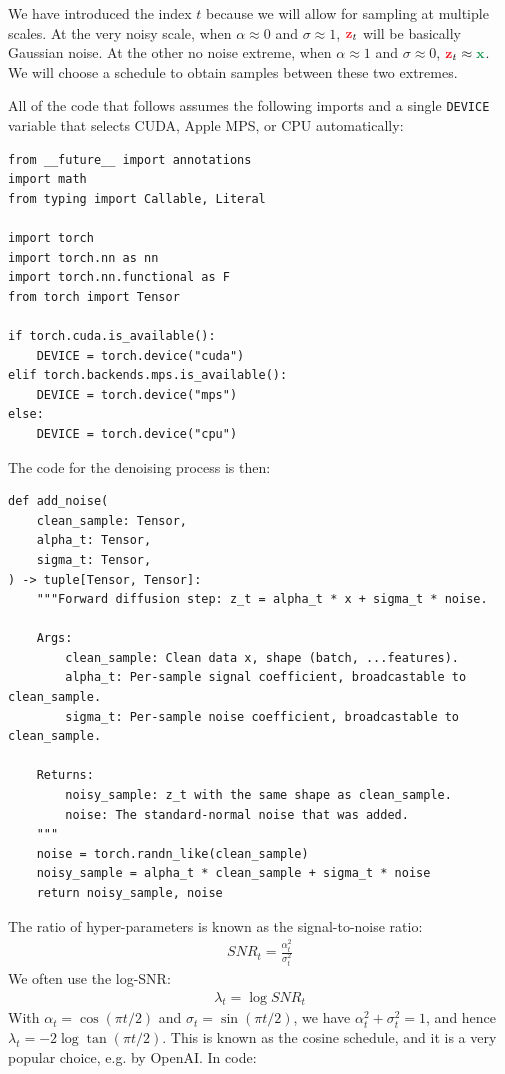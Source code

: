 \documentclass[usenames,dvipsnames]{article}
\newcommand{\myvec}[1]{\mathbf{#1}}
\newcommand{\vx}{\myvec{\textcolor{ForestGreen}{x}}}
\newcommand{\vz}{\myvec{\textcolor{Red}{z}}}
\begin{document}
We have introduced the index $t$ because we will allow for sampling at multiple scales. At the very noisy scale, when $\alpha \approx 0$ and $\sigma \approx 1$, $\vz_t$ will be basically Gaussian noise. At the other no noise extreme, when $\alpha \approx 1$ and $\sigma \approx 0$, $\vz_t \approx \vx$. We will choose a schedule to obtain samples between these two extremes.

All of the code that follows assumes the following imports and a single \texttt{DEVICE} variable that selects CUDA, Apple MPS, or CPU automatically:
\begin{verbatim}
from __future__ import annotations
import math
from typing import Callable, Literal

import torch
import torch.nn as nn
import torch.nn.functional as F
from torch import Tensor

if torch.cuda.is_available():
    DEVICE = torch.device("cuda")
elif torch.backends.mps.is_available():
    DEVICE = torch.device("mps")
else:
    DEVICE = torch.device("cpu")
\end{verbatim}

The code for the denoising process is then:

\begin{verbatim}
def add_noise(
    clean_sample: Tensor,
    alpha_t: Tensor,
    sigma_t: Tensor,
) -> tuple[Tensor, Tensor]:
    """Forward diffusion step: z_t = alpha_t * x + sigma_t * noise.

    Args:
        clean_sample: Clean data x, shape (batch, ...features).
        alpha_t: Per-sample signal coefficient, broadcastable to clean_sample.
        sigma_t: Per-sample noise coefficient, broadcastable to clean_sample.

    Returns:
        noisy_sample: z_t with the same shape as clean_sample.
        noise: The standard-normal noise that was added.
    """
    noise = torch.randn_like(clean_sample)
    noisy_sample = alpha_t * clean_sample + sigma_t * noise
    return noisy_sample, noise
\end{verbatim}


The ratio of hyper-parameters is known as the signal-to-noise ratio:
\begin{align}
SNR_t = \frac{\alpha_t^2}{\sigma_t^2}
\nonumber
\end{align}
We often use the log-SNR:
\begin{align}
\lambda_t = \log SNR_t
\end{align}
With $\alpha_t = \cos(\pi t /2)$ and $\sigma_t = \sin(\pi t /2)$, we have $\alpha_t^2 + \sigma_t^2 = 1$, and hence $\lambda_t = -2 \log\tan(\pi t/2)$. This is known as the cosine schedule, and it is a very popular choice, e.g. by OpenAI. In code:
\end{document}
